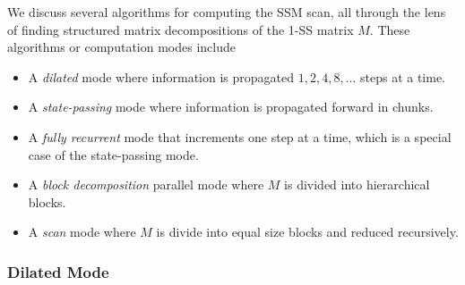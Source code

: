 We discuss several algorithms for computing the SSM scan, all through the lens of finding structured matrix decompositions of the 1-SS matrix $M$.
These algorithms or computation modes include
\begin{itemize}
  \item A \emph{dilated} mode where information is propagated $1, 2, 4, 8, \dots$ steps at a time.
  \item A \emph{state-passing} mode where information is propagated forward in chunks.
  \item A \emph{fully recurrent} mode that increments one step at a time, which is a special case of the state-passing mode.
  \item A \emph{block decomposition} parallel mode where $M$ is divided into hierarchical blocks.
  \item A \emph{scan} mode where $M$ is divide into equal size blocks and reduced recursively.
\end{itemize}

\subsubsection{Dilated Mode}

